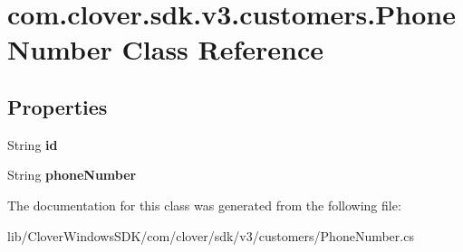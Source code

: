 \hypertarget{classcom_1_1clover_1_1sdk_1_1v3_1_1customers_1_1_phone_number}{}\section{com.\+clover.\+sdk.\+v3.\+customers.\+Phone\+Number Class Reference}
\label{classcom_1_1clover_1_1sdk_1_1v3_1_1customers_1_1_phone_number}
\subsection*{Properties}
\begin{DoxyCompactItemize}
\item 
\mbox{\label{classcom_1_1clover_1_1sdk_1_1v3_1_1customers_1_1_phone_number_aa3e5ad58834a7c06c2dfc4a37b62b530}} 
String {\bfseries id}
\item 
\mbox{\label{classcom_1_1clover_1_1sdk_1_1v3_1_1customers_1_1_phone_number_a00f32c354ed57ac1e607deff5a6066d0}} 
String {\bfseries phone\+Number}
\end{DoxyCompactItemize}


The documentation for this class was generated from the following file\+:\begin{DoxyCompactItemize}
\item 
lib/\+Clover\+Windows\+S\+D\+K/com/clover/sdk/v3/customers/Phone\+Number.\+cs\end{DoxyCompactItemize}
